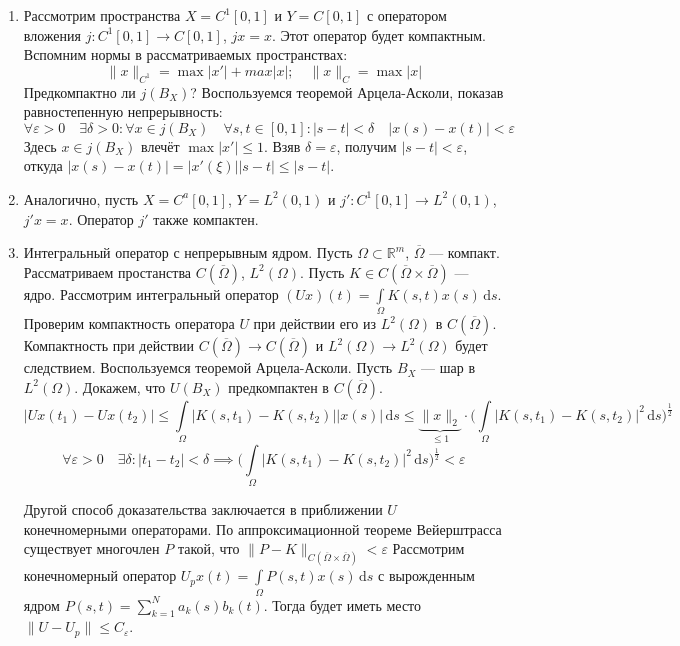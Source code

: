 \documentclass[11pt,openany,a4paper]{scrartcl}
\theoremstyle{plain}
\theoremstyle{definition}
\newcommand\mb{\mathbb}
\newcommand\real{\mb R}
\newcommand{\dif}{\, \mathrm d}
\newcommand\ol{\overline}
\begin{document}
\begin{enumerate}
    \item Рассмотрим пространства $X = C^1[0, 1]$ и $Y = C[0, 1]$ с оператором вложения
    $j: C^1[0, 1] \to C[0, 1]$, $jx = x$. Этот оператор будет компактным.
    Вспомним нормы в рассматриваемых пространствах:
    $$
    \|x\|_{C^1} = \max |x'| + max |x|;\quad \|x\|_C = \max |x|
    $$
    Предкомпактно ли $j(B_X)$? Воспользуемся теоремой Арцела-Асколи, показав равностепенную 
    непрерывность:
    $$
    \forall \varepsilon > 0\quad \exists \delta > 0 : \forall x \in j(B_X)\quad
    \forall s,t \in [0,1] : |s - t| < \delta\quad |x(s) - x(t)| < \varepsilon
    $$
    Здесь $x \in j(B_X)$ влечёт $\max |x'| \leqslant 1$. Взяв $\delta = \varepsilon$, получим
    $|s - t| < \varepsilon$, откуда $|x(s) - x(t)| = |x'(\xi)||s-t| \leqslant |s-t|$.
    
    \item Аналогично, пусть $X = C^a[0,1]$, $Y = L^2(0, 1)$ и $j' : C^1[0,1] \to L^2(0,1)$,
    $j'x = x$. Оператор $j'$ также компактен.
    
    \item Интегральный оператор с непрерывным ядром.
    Пусть $\Omega \subset \real^m$, $\ol\Omega$ — компакт. Рассматриваем простанства
    $C(\ol\Omega)$, $L^2(\Omega)$. Пусть $K \in C(\ol \Omega \times \ol \Omega)$ — ядро. Рассмотрим
    интегральный оператор
    $(Ux)(t) = \int\limits_\Omega K(s, t) x(s) \dif s$. Проверим компактность оператора $U$
    при действии его из $L^2(\Omega)$ в $C(\ol \Omega)$. Компактность при действии
    $C(\ol \Omega) \to C(\ol \Omega)$ и $L^2(\Omega) \to L^2(\Omega)$ будет следствием.
    Воспользуемся теоремой Арцела-Асколи. Пусть $B_X$ — шар в $L^2(\Omega)$.
    Докажем, что $U(B_X)$ предкомпактен в $C(\ol \Omega)$.
    $$
    |Ux(t_1) - Ux(t_2)| \leqslant \int\limits_\Omega |K(s, t_1) - K(s, t_2)||x(s)|\dif s \leqslant
    \underbrace{\|x\|_2}_{\leqslant 1} \cdot
    \bigg(\int\limits_\Omega |K(s, t_1) - K(s, t_2)|^2 \dif s\bigg)^{\frac{1}{2}}
    $$
    $$
    \forall \varepsilon > 0 \quad \exists \delta: |t_1 - t_2| < \delta \implies
    \bigg(\int\limits_\Omega |K(s, t_1) - K(s, t_2)|^2 \dif s\bigg)^{\frac{1}{2}} < \varepsilon
    $$
    
    Другой способ доказательства заключается в приближении $U$ конечномерными операторами.
    По аппроксимационной теореме Вейерштрасса
    существует многочлен $P$ такой, что $\|P - K\|_{C(\ol \Omega \times \ol \Omega)} < \varepsilon$
    Рассмотрим конечномерный оператор $U_px(t) = \int\limits_\Omega P(s, t) x(s) \dif s$ с 
    вырожденным ядром $P(s, t) =\sum\limits_{k=1}^N a_k(s)b_k(t)$.
    Тогда будет иметь место $\|U - U_p\| \leqslant C_\varepsilon$.
    

\end{enumerate}
\end{document}
